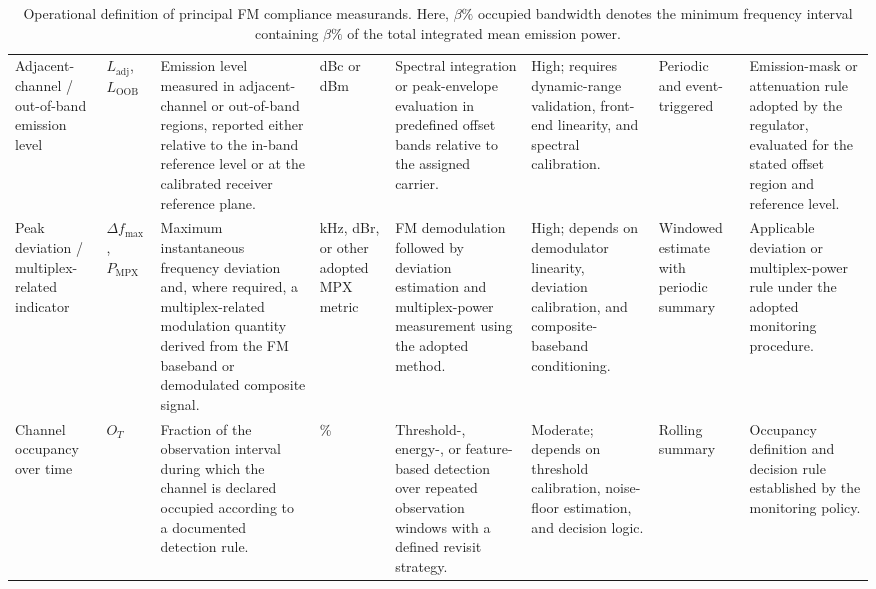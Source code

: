 \begin{table}
\begin{tabular}{p{2.1cm} p{0.9cm} p{4.2cm} p{1.2cm} p{3.9cm} p{3.3cm} p{1.8cm} p{3.9cm}}
		Adjacent-channel / out-of-band emission level
		& $L_{\mathrm{adj}}$, $L_{\mathrm{OOB}}$
		& Emission level measured in adjacent-channel or out-of-band regions, reported either relative to the in-band reference level or at the calibrated receiver reference plane.
		& dBc or dBm
		& Spectral integration or peak-envelope evaluation in predefined offset bands relative to the assigned carrier.
		& High; requires dynamic-range validation, front-end linearity, and spectral calibration.
		& Periodic and event-triggered
		& Emission-mask or attenuation rule adopted by the regulator, evaluated for the stated offset region and reference level. \\
		
		Peak deviation / multiplex-related indicator
		& $\Delta f_{\max}$, $P_{\mathrm{MPX}}$
		& Maximum instantaneous frequency deviation and, where required, a multiplex-related modulation quantity derived from the FM baseband or demodulated composite signal.
		& kHz, dBr, or other adopted MPX metric
		& FM demodulation followed by deviation estimation and multiplex-power measurement using the adopted method.
		& High; depends on demodulator linearity, deviation calibration, and composite-baseband conditioning.
		& Windowed estimate with periodic summary
		& Applicable deviation or multiplex-power rule under the adopted monitoring procedure. \\
		
		Channel occupancy over time
		& $O_T$
		& Fraction of the observation interval during which the channel is declared occupied according to a documented detection rule.
		& \%
		& Threshold-, energy-, or feature-based detection over repeated observation windows with a defined revisit strategy.
		& Moderate; depends on threshold calibration, noise-floor estimation, and decision logic.
		& Rolling summary
		& Occupancy definition and decision rule established by the monitoring policy. \\
		
		\hline
	\end{tabular}
	\caption{Operational definition of principal FM compliance measurands. Here, $\beta\%$ occupied bandwidth denotes the minimum frequency interval containing $\beta\%$ of the total integrated mean emission power.}
	\label{tab:fm_measurands_operational}
\end{table}